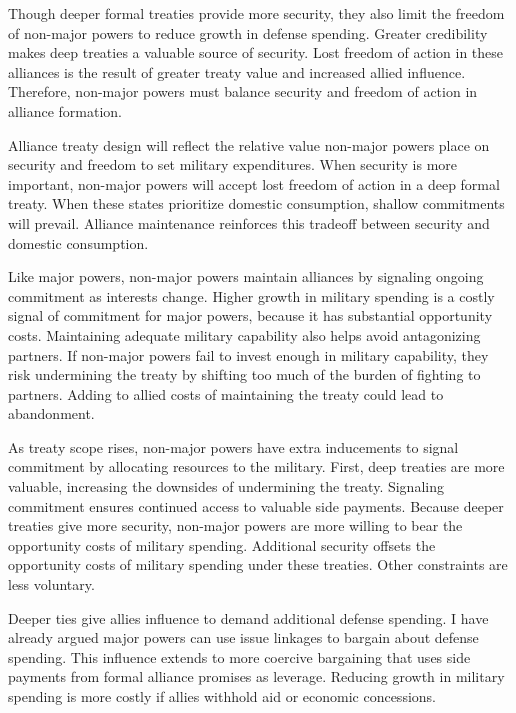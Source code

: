 \documentclass[12pt]{article}
\begin{document}
Though deeper formal treaties provide more security, they also limit the freedom of non-major powers to reduce growth in defense spending.
Greater credibility makes deep treaties a valuable source of security. 
Lost freedom of action in these alliances is the result of greater treaty value and increased allied influence. 
Therefore, non-major powers must balance security and freedom of action in alliance formation. 


Alliance treaty design will reflect the relative value non-major powers place on security and freedom to set military expenditures. 
When security is more important, non-major powers will accept lost freedom of action in a deep formal treaty.
When these states prioritize domestic consumption, shallow commitments will prevail. 
Alliance maintenance reinforces this tradeoff between security and domestic consumption. 


Like major powers, non-major powers maintain alliances by signaling ongoing commitment as interests change. 
Higher growth in military spending is a costly signal of commitment for major powers, because it has substantial opportunity costs. 
Maintaining adequate military capability also helps avoid antagonizing partners. 
If non-major powers fail to invest enough in military capability, they risk undermining the treaty by shifting too much of the burden of fighting to partners. 
Adding to allied costs of maintaining the treaty could lead to abandonment. 


As treaty scope rises, non-major powers have extra inducements to signal commitment by allocating resources to the military.
First, deep treaties are more valuable, increasing the downsides of undermining the treaty. 
Signaling commitment ensures continued access to valuable side payments.   
Because deeper treaties give more security, non-major powers are more willing to bear the opportunity costs of military spending. 
Additional security offsets the opportunity costs of military spending under these treaties.
Other constraints are less voluntary.   


Deeper ties give allies influence to demand additional defense spending. 
I have already argued major powers can use issue linkages to bargain about defense spending. 
This influence extends to more coercive bargaining that uses side payments from formal alliance promises as leverage. 
Reducing growth in military spending is more costly if allies withhold aid or economic concessions. 
\end{document}

